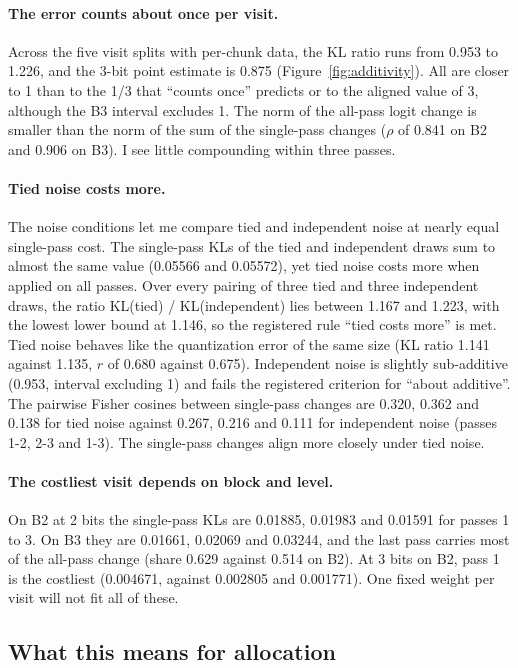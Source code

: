 \documentclass[11pt,a4paper]{article}
\begin{document}
\paragraph{The error counts about once per visit.} Across the five visit splits with per-chunk data, the KL ratio runs from 0.953 to 1.226, and the 3-bit point estimate is 0.875 (Figure~\ref{fig:additivity}). All are closer to 1 than to the 1/3 that ``counts once'' predicts or to the aligned value of 3, although the B3 interval excludes 1. The norm of the all-pass logit change is smaller than the norm of the sum of the single-pass changes ($\rho$ of 0.841 on B2 and 0.906 on B3). I see little compounding within three passes.

\paragraph{Tied noise costs more.} The noise conditions let me compare tied and independent noise at nearly equal single-pass cost. The single-pass KLs of the tied and independent draws sum to almost the same value (0.05566 and 0.05572), yet tied noise costs more when applied on all passes. Over every pairing of three tied and three independent draws, the ratio KL(tied) / KL(independent) lies between 1.167 and 1.223, with the lowest lower bound at 1.146, so the registered rule ``tied costs more'' is met. Tied noise behaves like the quantization error of the same size (KL ratio 1.141 against 1.135, $r$ of 0.680 against 0.675). Independent noise is slightly sub-additive (0.953, interval excluding 1) and fails the registered criterion for ``about additive''. The pairwise Fisher cosines between single-pass changes are 0.320, 0.362 and 0.138 for tied noise against 0.267, 0.216 and 0.111 for independent noise (passes 1-2, 2-3 and 1-3). The single-pass changes align more closely under tied noise.

\paragraph{The costliest visit depends on block and level.} On B2 at 2 bits the single-pass KLs are 0.01885, 0.01983 and 0.01591 for passes 1 to 3. On B3 they are 0.01661, 0.02069 and 0.03244, and the last pass carries most of the all-pass change (share 0.629 against 0.514 on B2). At 3 bits on B2, pass 1 is the costliest (0.004671, against 0.002805 and 0.001771). One fixed weight per visit will not fit all of these.

\subsection{What this means for allocation}
\end{document}
